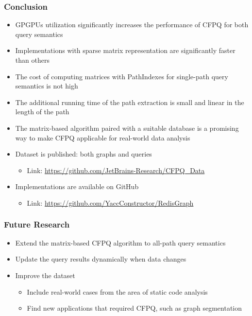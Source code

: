 \documentclass[xcolor=table]{beamer}
\begin{document}
\begin{frame}[fragile] \frametitle{Conclusion}
  \begin{itemize}
    \item GPGPUs utilization significantly increases the performance of CFPQ for both query semantics
    \pause
    \item Implementations with sparse matrix representation are significantly faster than others
    \pause
    \item The cost of computing matrices with PathIndexes for single-path query semantics is not high
    \pause
    \item The additional running time of the path extraction is small and linear in the length of the path
    \pause 
    \item The matrix-based algorithm paired with a suitable database is a promising way to make CFPQ applicable for
    real-world data analysis
  \end{itemize}
  \pause
  \begin{itemize}
    \item Dataset is published: both graphs and queries
    \begin{itemize}
    	\item Link: \url{https://github.com/JetBrains-Research/CFPQ_Data}
    \end{itemize}
    
    \item Implementations are available on GitHub
    \begin{itemize}
    	\item Link: \url{https://github.com/YaccConstructor/RedisGraph}
    \end{itemize}
    
  \end{itemize}
\end{frame}

\begin{frame}[fragile] \frametitle{Future Research}
  \begin{itemize}
  	\item Extend the matrix-based CFPQ algorithm to all-path
  	query semantics
  	\pause
  	\item Update the query results dynamically when data changes
  	\pause
    \item Improve the dataset
    \begin{itemize}
      \item Include real-world cases from
      the area of static code analysis
      \item Find new applications that required CFPQ, such as graph
      segmentation
    \end{itemize}
\end{itemize}
\end{frame}
\end{document}
